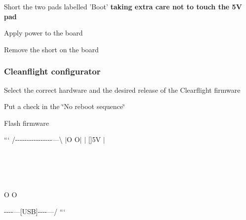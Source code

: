 \begin{DoxyItemize}
\item Short the two pads labelled 'Boot' {\bfseries taking extra care not to touch the 5\+V pad}
\item Apply power to the board
\item Remove the short on the board
\end{DoxyItemize}

\subsubsection*{Cleanflight configurator}


\begin{DoxyItemize}
\item Select the correct hardware and the desired release of the Clearflight firmware
\item Put a check in the \char`\"{}\+No reboot sequence\char`\"{}
\item Flash firmware
\end{DoxyItemize}

``` /-\/-\/-\/-\/-\/-\/-\/-\/-\/-\/-\/-\/-\/-\/-\/-\/---\textbackslash{} $\vert$\+O O$\vert$ $\vert$ \mbox{[}\mbox{]}5\+V $\vert$ \begin{TabularC}{1}
\hline
{}\\
\\
\\
\\
O O \\
\end{TabularC}
-\/-\/-\/-\/---\mbox{[}U\+S\+B\mbox{]}-\/-\/-\/-\/---/ ``` 